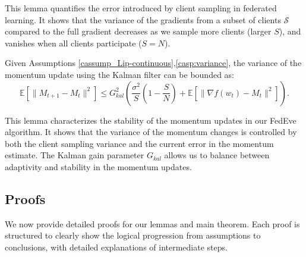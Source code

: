 This lemma quantifies the error introduced by client sampling in federated learning. It shows that the variance of the gradients from a subset of clients \(\mathcal{S}\) compared to the full gradient decreases as we sample more clients (larger \(S\)), and vanishes when all clients participate (\(S = N\)).

\begin{lemma} \label{lem:kalman-filter-variance}
    Given Assumptions \ref{cassump_Lip-continuous},\ref{casp:variance}, the variance of the momentum update using the Kalman filter can be bounded as:
    \[
        \mathbb{E}[\|M_{t+1} - M_t\|^2] \leq G_{kal}^2 \left( \frac{\sigma^2}{S} \left(1 - \frac{S}{N}\right) + \mathbb{E}[\|\nabla f(w_t) - M_t\|^2] \right).
    \]
\end{lemma}

This lemma characterizes the stability of the momentum updates in our FedEve algorithm. It shows that the variance of the momentum changes is controlled by both the client sampling variance and the current error in the momentum estimate. The Kalman gain parameter \(G_{kal}\) allows us to balance between adaptivity and stability in the momentum updates.

\subsection{Proofs}
We now provide detailed proofs for our lemmas and main theorem. Each proof is structured to clearly show the logical progression from assumptions to conclusions, with detailed explanations of intermediate steps.

